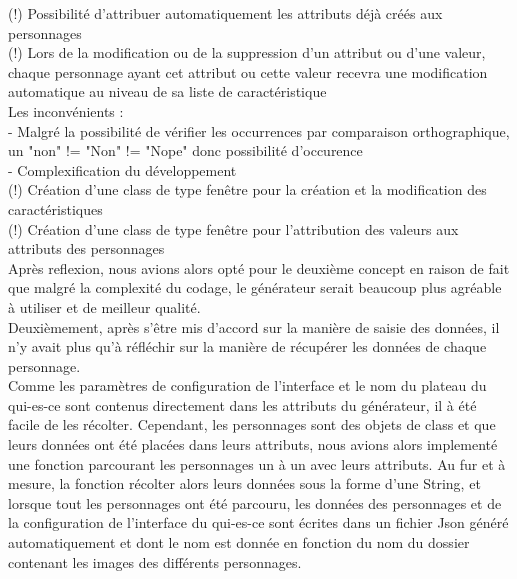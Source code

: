 \documentclass[a4paper]{article}
\begin{document}
 (!) Possibilité d'attribuer automatiquement les attributs déjà créés aux personnages\\
 
 (!) Lors de la modification ou de la suppression d'un attribut ou d'une valeur, chaque personnage ayant cet attribut ou cette valeur recevra une modification automatique au niveau de sa liste de caractéristique\\
             
 Les inconvénients :\\
 - Malgré la possibilité de vérifier les occurrences par comparaison orthographique, un "non" != "Non" != "Nope" donc possibilité d'occurence\\
 - Complexification du développement\\
 
 (!) Création d'une class de type fenêtre pour la création et la modification des caractéristiques\\
 
 (!) Création d'une class de type fenêtre pour l'attribution des valeurs aux attributs des personnages\\              
 
 Après reflexion, nous avions alors opté pour le deuxième concept en raison de fait que malgré la complexité du codage, le générateur serait beaucoup plus agréable à utiliser et de meilleur qualité.\\
 
 Deuxièmement, après s'être mis d'accord sur la manière de saisie des données, il n'y avait plus qu'à réfléchir 
 sur la manière de récupérer les données de chaque personnage.\\
 Comme les paramètres de configuration de l'interface et le nom du plateau du qui-es-ce sont contenus directement dans les attributs du générateur, il à été facile de les récolter. 
 Cependant, les personnages sont des objets de class et que leurs données ont été placées dans leurs attributs, nous avions alors implementé une fonction parcourant les personnages un à un avec leurs attributs. Au fur et à mesure, la fonction 
 récolter alors leurs données sous la forme d'une String, et lorsque tout les personnages ont été parcouru,
 les données des personnages et de la configuration de l'interface du qui-es-ce sont écrites dans un fichier Json généré automatiquement et dont le nom est donnée en fonction du nom du dossier contenant les images des différents personnages.
 
\end{document}
